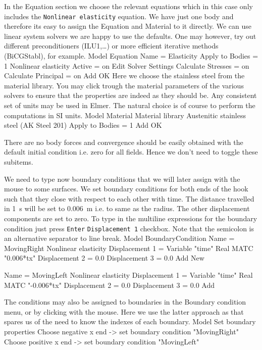 In the Equation section we choose the relevant equations which in this case only includes 
the \texttt{Nonlinear elasticity} equation.
We have just one body and therefore its easy to assign 
the Equation and Material to it directly.
We can use linear system solvers we are happy to use the defaults. One may however, try out different
preconditioners (ILU1,\ldots) or more efficient iterative methods (BiCGStabl), for example.
\ttbegin
Model
  Equation
    Name = Elasticity
    Apply to Bodies = 1
    Nonlinear elasticity
      Active = on
      Edit Solver Settings
        Calculate Stresses = on
        Calculate Principal = on
    Add 
    OK
\ttend        
Here we choose the stainless steel from the material library.
You may click trough the material parameters of the various solvers to ensure that
the properties are indeed as they should be. Any consistent set of units may be used in Elmer.
The natural choice is of course to perform the computations in SI units. 
\ttbegin
Model
  Material
    Material library    
      Austenitic stainless steel (AK Steel 201)
    Apply to Bodies = 1 
    Add
    OK
\ttend

There are no body forces and convergence should be easily obtained with the default 
initial condition i.e. zero for all fields. Hence we don't need to toggle these subitems. 

We need to type now boundary conditions that we will later assign with the mouse to some surfaces.
We set boundary conditions for both ends of the hook such that
they close with respect to each other with time. The distance travelled in 1~s will be set to
0.006~m i.e. to same as the radius. The other displacement components are set to zero.  
To type in the multiline expressions for the boundary condition just press \texttt{Enter}
\texttt{Displacement 1} checkbox.
Note that the semicolon is an alternative separator
to line break. 
\ttbegin
Model
  BoundaryCondition
    Name = MovingRight
    Nonlinear elasticity
      Displacement 1 = Variable "time"
        Real MATC "0.006*tx"
      Displacement 2 = 0.0
      Displacement 3 = 0.0
    Add
    New

    Name = MovingLeft 
    Nonlinear elasticity
      Displacement 1 = Variable "time"
        Real MATC "-0.006*tx"
      Displacement 2 = 0.0
      Displacement 3 = 0.0
    Add 
\ttend   

The conditions may also be assigned to boundaries in the Boundary condition menu, or 
by clicking with the mouse. Here we use the latter approach as that spares us of the 
need to know the indexes of each boundary.
\ttbegin
Model
  Set boundary properties
    Choose negative x end -> set boundary condition "MovingRight"
    Choose positive x end  -> set boundary condition "MovingLeft"
\ttend

